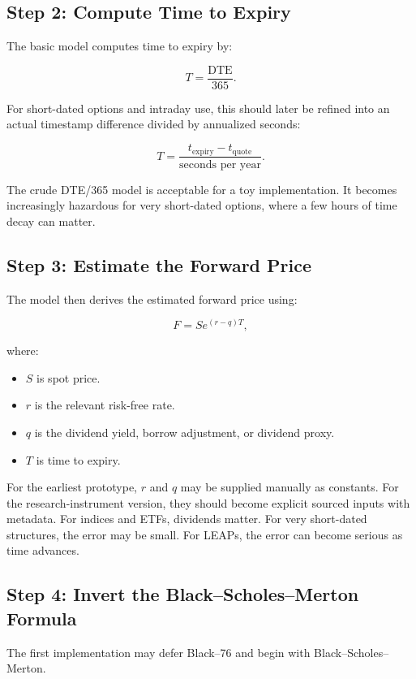 \documentclass[11pt]{article}
\begin{document}
\subsection{Step 2: Compute Time to Expiry}

The basic model computes time to expiry by:

\[
T = \frac{\text{DTE}}{365}.
\]

For short-dated options and intraday use, this should later be refined into an actual timestamp difference divided by annualized seconds:

\[
T =
\frac{
t_{\text{expiry}} - t_{\text{quote}}
}{
\text{seconds per year}
}.
\]

The crude DTE/365 model is acceptable for a toy implementation. It becomes increasingly hazardous for very short-dated options, where a few hours of time decay can matter.

\subsection{Step 3: Estimate the Forward Price}

The model then derives the estimated forward price using:

\[
F = S e^{(r-q)T},
\]

where:

\begin{itemize}[leftmargin=1.5em]
    \item $S$ is spot price.
    \item $r$ is the relevant risk-free rate.
    \item $q$ is the dividend yield, borrow adjustment, or dividend proxy.
    \item $T$ is time to expiry.
\end{itemize}

For the earliest prototype, $r$ and $q$ may be supplied manually as constants. For the research-instrument version, they should become explicit sourced inputs with metadata. For indices and ETFs, dividends matter. For very short-dated structures, the error may be small. For LEAPs, the error can become serious as time advances.

\subsection{Step 4: Invert the Black--Scholes--Merton Formula}

The first implementation may defer Black--76 and begin with Black--Scholes--Merton.
\end{document}
